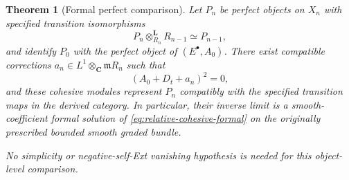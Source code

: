 \documentclass[11pt]{article}
\newtheorem{theorem}{Theorem}[section]
\theoremstyle{definition}
\theoremstyle{remark}
\newcommand{\C}{\mathbf C}
\begin{document}
\begin{theorem}[Formal perfect comparison]
\label{thm:formal-perfect-cohesive}
Let $P_n$ be perfect objects on $X_n$ with specified transition
isomorphisms
\[
 P_n\otimes^{\mathbf L}_{R_n}R_{n-1}\simeq P_{n-1},
\]
and identify $P_0$ with the perfect object of $(E^\bullet,A_0)$.
There exist compatible corrections
$a_n\in L^1\otimes_\C\mathfrak m R_n$ such that
\[
 (A_0+D_t+a_n)^2=0,
\]
and these cohesive modules represent $P_n$ compatibly with the
specified transition maps in the derived category.  In particular,
their inverse limit is a smooth-coefficient formal solution of
\eqref{eq:relative-cohesive-formal} on the originally prescribed
bounded smooth graded bundle.

No simplicity or negative-self-Ext vanishing hypothesis is needed
for this object-level comparison.
\end{theorem}
\end{document}
